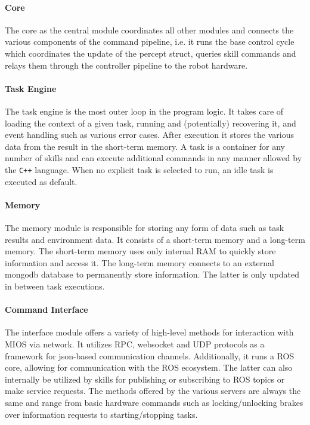 \paragraph{Core}
The core as the central module coordinates all other modules and connects the various components of the command pipeline, i.e. it runs the base control cycle which coordinates the update of the percept struct, queries skill commands and relays them through the controller pipeline to the robot hardware.

\paragraph{Task Engine}
The task engine is the most outer loop in the program logic.
It takes care of loading the context of a given task, running and (potentially) recovering it, and event handling such as various error cases.
After execution it stores the various data from the result in the short-term memory.
A task is a container for any number of skills and can execute additional commands in any manner allowed by the \verb!C++! language.
When no explicit task is selected to run, an idle task is executed as default.

\paragraph{Memory}
The memory module is responsible for storing any form of data such as task results and environment data.
It consists of a short-term memory and a long-term memory.
The short-term memory uses only internal RAM to quickly store information and access it.
The long-term memory connects to an external mongodb database to permanently store information.
The latter is only updated in between task executions.

\paragraph{Command Interface}
The interface module offers a variety of high-level methods for interaction with MIOS via network.
It utilizes RPC, websocket and UDP protocols as a framework for json-based communication channels.
Additionally, it runs a ROS core, allowing for communication with the ROS ecosystem.
The latter can also internally be utilized by skills for publishing or subscribing to ROS topics or make service requests.
The methods offered by the various servers are always the same and range from basic hardware commands such as locking/unlocking brakes over information requests to starting/stopping tasks.

